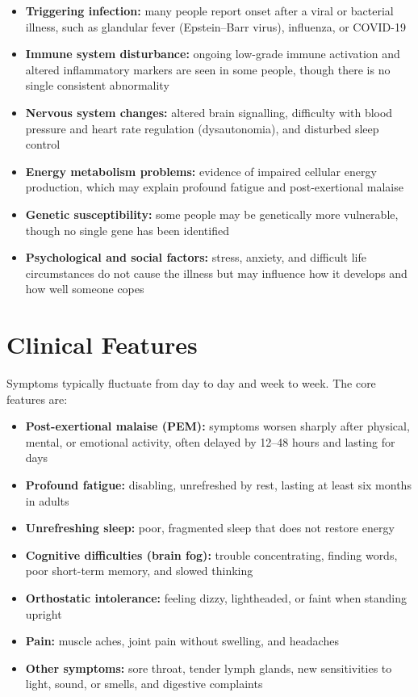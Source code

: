 \begin{itemize}
    \item \textbf{Triggering infection:} many people report onset after a viral or bacterial illness, such as glandular fever (Epstein--Barr virus), influenza, or COVID-19
    \item \textbf{Immune system disturbance:} ongoing low-grade immune activation and altered inflammatory markers are seen in some people, though there is no single consistent abnormality
    \item \textbf{Nervous system changes:} altered brain signalling, difficulty with blood pressure and heart rate regulation (dysautonomia), and disturbed sleep control
    \item \textbf{Energy metabolism problems:} evidence of impaired cellular energy production, which may explain profound fatigue and post-exertional malaise
    \item \textbf{Genetic susceptibility:} some people may be genetically more vulnerable, though no single gene has been identified
    \item \textbf{Psychological and social factors:} stress, anxiety, and difficult life circumstances do not cause the illness but may influence how it develops and how well someone copes
\end{itemize}

\section*{Clinical Features}
Symptoms typically fluctuate from day to day and week to week. The core features are:

\begin{itemize}
    \item \textbf{Post-exertional malaise (PEM):} symptoms worsen sharply after physical, mental, or emotional activity, often delayed by 12--48 hours and lasting for days
    \item \textbf{Profound fatigue:} disabling, unrefreshed by rest, lasting at least six months in adults
    \item \textbf{Unrefreshing sleep:} poor, fragmented sleep that does not restore energy
    \item \textbf{Cognitive difficulties (brain fog):} trouble concentrating, finding words, poor short-term memory, and slowed thinking
    \item \textbf{Orthostatic intolerance:} feeling dizzy, lightheaded, or faint when standing upright
    \item \textbf{Pain:} muscle aches, joint pain without swelling, and headaches
    \item \textbf{Other symptoms:} sore throat, tender lymph glands, new sensitivities to light, sound, or smells, and digestive complaints
\end{itemize}


